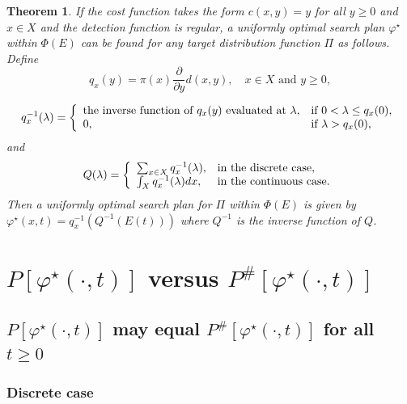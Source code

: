 \documentclass[12pt]{article}
\newtheorem{theorem}{Theorem}[section]
\theoremstyle{plain}
\theoremstyle{definition}
\theoremstyle{remark}
\begin{document}
\begin{theorem}
\label{thm:unifopt}
If the cost function takes the form $c(x,y)=y$ for all $y\geq 0$ and $x\in X$ and the detection function is regular,  a uniformly optimal search plan $\varphi^\star$ within $\Phi(E)$ can be found for any target distribution function $\Pi$ as follows.  Define
\begin{equation}
q_x (y)=\pi(x)\frac{\partial }{\partial y}d(x, y), \quad x\in X \text{ and $y\geq 0$},
\end{equation}

\begin{equation}
q^{-1}_x(\lambda)=\left\{
		                           \begin{array}{ll}
		                           \text{the inverse function of $q_x(y)$  evaluated at $\lambda$},& \hbox{if $0<\lambda\leq q_x(0)$,} \\
					0, & \hbox{if $\lambda>q_x(0)$,} 
		                          \end{array}
		                         \right.
\end{equation}		                       
and 
\begin{equation}
Q(\lambda)= \left\{
		                           \begin{array}{ll}
		                          \sum_{x\in X} q_x^{-1}(\lambda),  & \hbox{in the discrete case,} \\
					 \int_X q_x^{-1}(\lambda)dx,  & \hbox{in the continuous case.} 
		                          \end{array}
		                         \right.
\end{equation}
Then a uniformly optimal search plan for $\Pi$ within  $\Phi(E)$ is given by $\varphi^\star(x, t)=q_x^{-1}(Q^{-1}(E(t)))$ where $Q^{-1}$ is the inverse function of $Q$. 
\end{theorem}


%
\section{$P[\varphi^\star(\cdot, t)]$ versus $P^{\#}[\varphi^\star(\cdot, t)]$}

\subsection{$P[\varphi^\star(\cdot, t)]$ may equal $P^{\#}[\varphi^\star(\cdot, t)]$ for all $t\geq 0$}



\subsubsection{Discrete case}
\end{document}

